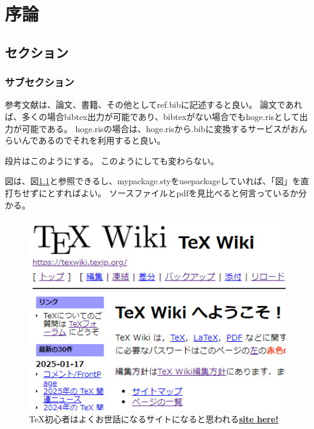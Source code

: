 
% 
\chapter{序論}
\section{セクション}
\subsection{サブセクション}
参考文献は、論文\cite{sample-2}、書籍\cite{totto2023}、その他\cite{sample}としてref.bibに記述すると良い。
論文であれば、多くの場合bibtex出力が可能であり、bibtexがない場合でもhoge.risとして出力が可能である。
hoge.risの場合は、hoge.risから.bibに変換するサービスがおんらいんであるのでそれを利用すると良い。

段片はこのようにする。
このようにしても変わらない。

図は、図\ref{texwiki}と参照できるし、mypackage.styをusepackageしていれば、「図」を直打ちせずにとすればよい。
ソースファイルとpdfを見比べると何言っているか分かる。

\clearpage

\begin{figure}[htbp]
  \centering
  \includegraphics[width=.6\linewidth]{fig/sample.png}
  \caption{\TeX 初心者はよくお世話になるサイトになると思われる\href{https://texwiki.texjp.org}{\bf site here!}}
  \label{texwiki}
\end{figure}

% 